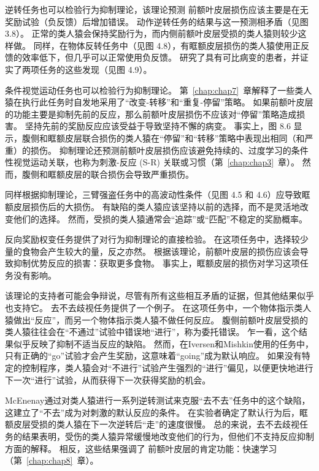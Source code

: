 逆转任务也可以检验行为抑制理论，该理论预测 前额叶皮层损伤应该主要是在无奖励试验（负反馈）后增加错误。
动作逆转任务的结果与这一预测相矛盾（见图3.8）。
正常的类人猿会保持奖励行为，而内侧前额叶皮层受损的类人猿则较少这样做\cite{kennerley2006optimal,rudebeck2008amygdala}。
同样，在物体反转任务中（见图 4.8），有眶额皮层损伤的类人猿使用正反馈的效率低下，但几乎可以正常使用负反馈\cite{rudebeck2008amygdala}。
研究了具有可比病变的患者，并证实了两项任务的这些发现（见图 4.9）。
\par


条件视觉运动任务也可以检验行为抑制理论。
第~\ref{chap:chap7}~章解释了一些类人猿在执行此任务时自发地采用了“改变-转移”和“重复-停留”策略\cite{wise1999role}。
如果前额叶皮层的功能主要是抑制先前的反应，那么前额叶皮层损伤不应该对“停留”策略造成损害。
坚持先前的奖励反应应该受益于导致坚持不懈的病变。 
事实上，图 8.6 显示，腹侧和眶额皮层联合损伤的类人猿在“停留”和“转移”策略中表现出相同（和严重）的损伤。
抑制理论还预测前额叶皮层损伤应该避免持续的、过度学习的条件性视觉运动关联，也称为刺激-反应 (S-R) 关联或习惯（第~\ref{chap:chap3}~章）。
然而，腹侧和眶额皮层的联合损伤会导致严重损伤\cite{bussey2001role}。
\par


同样根据抑制理论，三臂强盗任务中的高波动性条件（见图 4.5 和 4.6）应导致眶额皮层损伤后的大损伤。
有缺陷的类人猿应该坚持以前的选择，而不是灵活地改变他们的选择。
然而，受损的类人猿通常会“追踪”或“匹配”不稳定的奖励概率\cite{walton2010separable}。
\par


反向奖励权变任务提供了对行为抑制理论的直接检验。
在这项任务中，选择较少量的食物会产生较大的量，反之亦然。
根据该理论，前额叶皮层的损伤应该会导致抑制优势反应的损害：获取更多食物。
事实上，眶额皮层的损伤对学习这项任务没有影响\cite{chudasama2007rhesus}。
\par


该理论的支持者可能会争辩说，尽管有所有这些相互矛盾的证据，但其他结果似乎也支持它。
去不去歧视任务提供了一个例子。
在这项任务中，一个物体指示类人猿做出“反应”，而另一个物体指示类人猿不做任何反应。
腹侧前额叶皮层受损的类人猿往往会在“不通过”试验中错误地“进行”\cite{iversen1970perseverative}，称为委托错误。
乍一看，这个结果似乎反映了抑制不适当反应的缺陷。
然而，在Iversen和Mishkin使用的任务中，只有正确的“go”试验才会产生奖励，这意味着“going”成为默认响应。
如果没有特定的控制程序，类人猿会对“不进行”试验产生强烈的“进行”偏见，以便更快地进行下一次“进行”试验，从而获得下一次获得奖励的机会。
\par


McEnenay\cite{mcenaney1969perseveration}通过对类人猿进行一系列逆转测试来克服“去不去”任务中的这个缺陷，这建立了“不去”成为对刺激的默认反应的条件。
在实验者确定了默认行为后，眶额皮层受损的类人猿在下一次逆转后“走”的速度很慢。
总的来说，去不去歧视任务的结果表明，受伤的类人猿异常缓慢地改变他们的行为，但他们不支持反应抑制方面的解释。
相反，这些结果强调了 前额叶皮层的肯定功能：快速学习（第~\ref{chap:chap8}~章）。
\par


